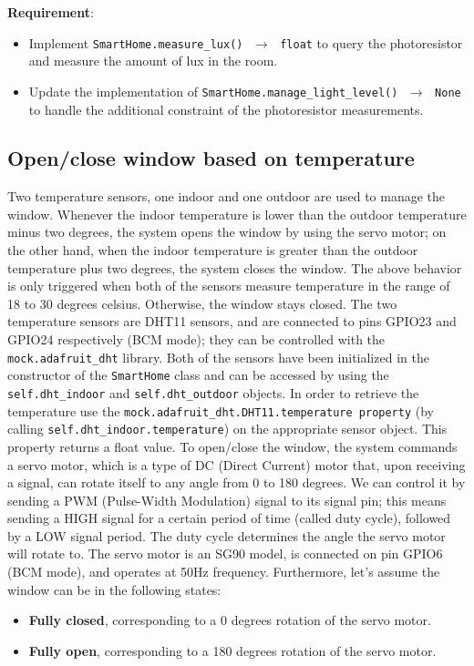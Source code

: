 \noindent\textbf{Requirement}:
\begin{itemize}
    \item Implement \texttt{SmartHome.measure\_lux() $\,\to\,$ float} to query the photoresistor and measure the amount of lux in the room.
    \item Update the implementation of \texttt{SmartHome.manage\_light\_level() $\,\to\,$ None} to handle the additional constraint of the photoresistor measurements.
\end{itemize}


\subsection{Open/close window based on temperature}
Two temperature sensors, one indoor and one outdoor are used to manage the window. 
Whenever the indoor temperature is lower than the outdoor temperature minus two degrees, the system opens the window by using the servo motor; on the other hand, when the indoor temperature is greater than the outdoor temperature plus two degrees, the system closes the window.
The above behavior is only triggered when both of the sensors measure temperature in the range of 18 to 30 degrees celsius. Otherwise, the window stays closed.
The two temperature sensors are DHT11 sensors, and are connected to pins GPIO23 and GPIO24 respectively (BCM mode); they can be controlled with the \texttt{mock.adafruit\_dht} library.
Both of the sensors have been initialized in the constructor of the \texttt{SmartHome} class and can be accessed by using the \texttt{self.dht\_indoor} and \texttt{self.dht\_outdoor} objects.
In order to retrieve the temperature use the  \texttt{mock.adafruit\_dht.DHT11.temperature property} (\ie by calling  \texttt{self.dht\_indoor.temperature}) on the appropriate sensor object. This property returns a float value.
To open/close the window, the system commands a servo motor, which is a type of DC (Direct Current) motor that, upon receiving a signal, can rotate itself to any angle from 0 to 180 degrees. We can control it by sending a PWM (Pulse-Width Modulation) signal to its signal pin; this means sending a HIGH signal for a certain period of time (called duty cycle), followed by a LOW signal period. The duty cycle determines the angle the servo motor will rotate to.
The servo motor is an SG90 model, is connected on pin GPIO6 (BCM mode), and operates at 50Hz frequency. Furthermore, let's assume the window can be in the following states:
\begin{itemize}
    \item \textbf{Fully closed}, corresponding to a 0 degrees rotation of the servo motor.
    \item \textbf{Fully open}, corresponding to a 180 degrees rotation of the servo motor.
\end{itemize}

